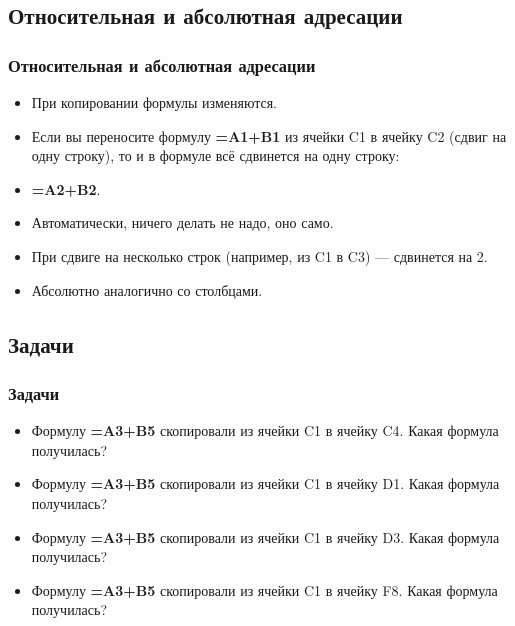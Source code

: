\documentclass[compress,red]{beamer}
\begin{document}
\subsection{Относительная и абсолютная адресации}
\begin{frame}[fragile]
  \frametitle{Относительная и абсолютная адресации}
  \begin{itemize}[<+->]
    \item При копировании формулы изменяются. 
    \item Если вы переносите формулу \textbf{=A1+B1} из ячейки C1 в ячейку C2 (сдвиг на одну строку), то и в формуле всё сдвинется на одну строку:
    \item \textbf{=A2+B2}.
    \item Автоматически, ничего делать не надо, оно само.
    \item При сдвиге на несколько строк (например, из C1 в C3) --- сдвинется на 2.
    \item Абсолютно аналогично со столбцами.
  \end{itemize}
\end{frame}

\subsection{Задачи}
\begin{frame}[fragile]
  \frametitle{Задачи}
  \begin{itemize}[<+->]
    \item Формулу \textbf{=A3+B5} скопировали из ячейки C1 в ячейку C4. Какая формула получилась?
    \item Формулу \textbf{=A3+B5} скопировали из ячейки C1 в ячейку D1. Какая формула получилась?
    \item Формулу \textbf{=A3+B5} скопировали из ячейки C1 в ячейку D3. Какая формула получилась?
    \item Формулу \textbf{=A3+B5} скопировали из ячейки C1 в ячейку F8. Какая формула получилась?
  \end{itemize}
\end{frame}
\end{document}
